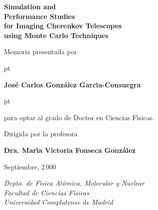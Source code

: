 %



\def\mititulo{%
Simulation and \\%
Performance Studies\\%
for Imaging Cherenkov Telescopes\\%
using Monte Carlo Techniques\\}

\thispagestyle{empty}  

\mbox{}

\vskip 50pt

\begin{center}

{\Huge \sffamily \bfseries \sc \mititulo}

\vskip 80pt

{
\large \itshape

Memoria presentada por

 pt

{\Large \bfseries \rm Jos{\'{e}} Carlos Gonz{\'{a}}lez Garc{\'{\i}}a-Consuegra}

 pt

para optar al grado de Doctor en Ciencias F{\'{\i}}sicas.

\vskip 40pt

Dirigida por la profesora

\vskip 25pt

{\Large \bfseries \rm Dra. Mar{\'{\i}}a Victoria Fonseca Gonz{\'{a}}lez}

}

\vskip 45pt

{\Large \rm Septiembre, 2\,000 \\}

\vskip 45pt

{\it \small
Depto. de F{\'{\i}}sica At{\'{o}}mica, Molecular y Nuclear\\
Facultad de Ciencias F{\'{\i}}sicas\\
Universidad Complutense de Madrid\\
} 

\end{center}

